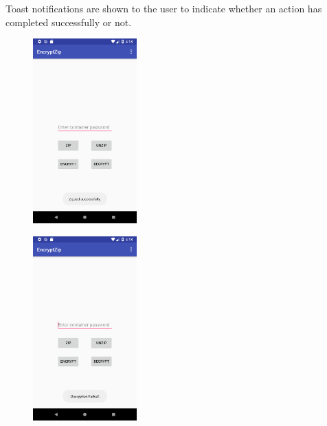 \documentclass[10pt,a4paper]{article}
\begin{document}
Toast notifications are shown to the user to indicate whether an action has completed successfully or not.
\begin{figure}[h]
\includegraphics[width=4cm]{toast1}
\end{figure}
\begin{figure}[h]
\includegraphics[width=4cm]{toast2}
\end{figure}

\clearpage
\end{document}
